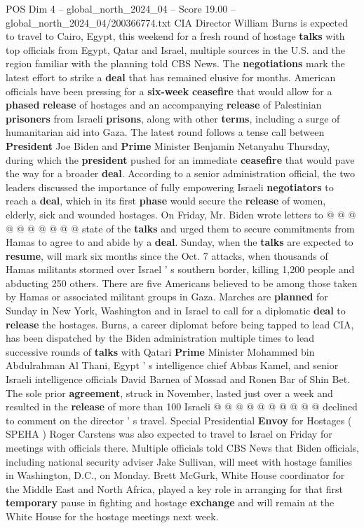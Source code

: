 \begin{textsample}{POS Dim 4 – global\_north\_2024\_04 – Score 19.00 – global\_north\_2024\_04/200366774.txt}  \label{ex:f4_pos_366}
CIA Director William Burns is expected to travel to Cairo, Egypt, this weekend for a fresh round of hostage \textbf{talks} with top officials from Egypt, Qatar and Israel, multiple sources in the U.S. and the region familiar with the planning told CBS News.
The \textbf{negotiations} mark the latest effort to strike a \textbf{deal} that has remained elusive for months.
American officials have been pressing for a \textbf{six-week} \textbf{ceasefire} that would allow for a \textbf{phased} \textbf{release} of hostages and an accompanying \textbf{release} of Palestinian \textbf{prisoners} from Israeli \textbf{prisons}, along with other \textbf{terms}, including a surge of humanitarian aid into Gaza.
The latest round follows a tense call between \textbf{President} Joe Biden and \textbf{Prime} Minister Benjamin Netanyahu Thursday, during which the \textbf{president} pushed for an immediate \textbf{ceasefire} that would pave the way for a broader \textbf{deal}.
According to a senior administration official, the two leaders discussed the importance of fully empowering Israeli \textbf{negotiators} to reach a \textbf{deal}, which in its first \textbf{phase} would secure the \textbf{release} of women, elderly, sick and wounded hostages.
On Friday, Mr.
Biden wrote letters to @ @ @ @ @ @ @ @ @ @ state of the \textbf{talks} and urged them to secure commitments from Hamas to agree to and abide by a \textbf{deal}.
Sunday, when the \textbf{talks} are expected to \textbf{resume}, will mark six months since the Oct. 7 attacks, when thousands of Hamas militants stormed over Israel ' s southern border, killing 1,200 people and abducting 250 others.
There are five Americans believed to be among those taken by Hamas or associated militant groups in Gaza.
Marches are \textbf{planned} for Sunday in New York, Washington and in Israel to call for a diplomatic \textbf{deal} to \textbf{release} the hostages.
Burns, a career diplomat before being tapped to lead CIA, has been dispatched by the Biden administration multiple times to lead successive rounds of \textbf{talks} with Qatari \textbf{Prime} Minister Mohammed bin Abdulrahman Al Thani, Egypt ' s intelligence chief Abbas Kamel, and senior Israeli intelligence officials David Barnea of Mossad and Ronen Bar of Shin Bet.
The sole prior \textbf{agreement}, struck in November, lasted just over a week and resulted in the \textbf{release} of more than 100 Israeli @ @ @ @ @ @ @ @ @ @ declined to comment on the director ' s travel.
Special Presidential \textbf{Envoy} for Hostages ( SPEHA ) Roger Carstens was also expected to travel to Israel on Friday for meetings with officials there.
Multiple officials told CBS News that Biden officials, including national security adviser Jake Sullivan, will meet with hostage families in Washington, D.C., on Monday.
Brett McGurk, White House coordinator for the Middle East and North Africa, played a key role in arranging for that first \textbf{temporary} pause in fighting and hostage \textbf{exchange} and will remain at the White House for the hostage meetings next week.


\end{textsample}
